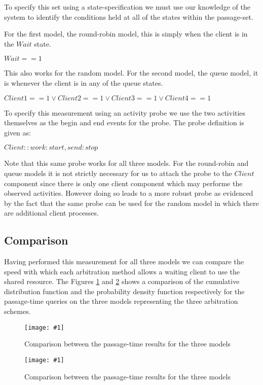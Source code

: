 \documentclass[times, 10pt,twocolumn]{article}
\newcommand{\graphicfigure}[3]{
\begin{figure}
\texttt{[image: \#1]}
\caption{
\label{#2}
#3
}
\end{figure}
}
\newcommand{\showprobe}[1]{$#1$}
\newcommand{\showstatespec}[1]{$#1$}
\newcommand{\quoteProcess}[1]{$#1$}
\begin{document}
To specify this set using a state-specification we must use our
knowledge of the system to identify the conditions held at all
of the states within the passage-set.

For the first model, the round-robin model, this is simply when
the client is in the \quoteProcess{Wait} state.

\showstatespec{Wait == 1}

\noindent
This also works for the random model.
For the second model, the queue model, it is whenever the client is in
any of the queue states.

\showstatespec{ Client1 == 1 \vee Client2 == 1 \vee Client3 == 1 \vee Client4 == 1}

\noindent
To specify this measurement using an activity probe we use the two activities
themselves as the begin and end events for the probe.
The probe definition is given as:

\showprobe{ Client::work:start, send:stop }

\noindent
Note that this same probe works for all three models.
For the round-robin and queue models it is not strictly necessary
for us to attach the probe to the \quoteProcess{Client} component
since there is only one client component which may performe the
observed activities. However doing so leads to a more robust probe
as evidenced by the fact that the same probe can be used for the
random model in which there are additional client processes.

\subsection{Comparison}

Having performed this measurement for all three models we can compare
the speed with which each arbitration method allows a waiting client
to use the shared resource.
The Figures \ref{figure:compare:cdf} and \ref{figure:compare:pdf}
shows a comparison of the cumulative distribution function 
and the probability density function respectively 
for the passage-time queries on the three models
representing the three arbitration schemes. 

\graphicfigure{compare_cdf.pdf}
              {figure:compare:cdf}
              {Comparison between the passage-time results for the three models}

\graphicfigure{compare_pdf.pdf}
              {figure:compare:pdf}
              {Comparison between the passage-time results for the three models}
\end{document}
